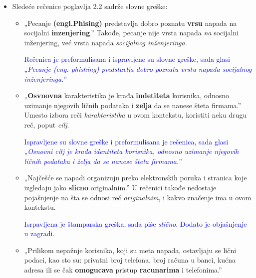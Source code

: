 \documentclass[a4paper]{report}
\newcommand{\odgovor}[1]{\textcolor{blue}{#1}}
\begin{document}
\begin{itemize}
    \item Sledeće rečenice poglavlja 2.2 sadrže slovne greške:
    \begin{itemize}
        \item „Pecanje \textbf{(engl.Phising)} predstavlja dobro poznatu \textbf{vrsu} napada na socijalni \textbf{inzenjering}.”\newline
Takođe, pecanje nije vrsta napada \textit{na} socijalni inženjering, već vrsta napada \textit{socijalnog inženjeringa}.

		\odgovor{Rečenica je preformulisana i ispravljene su slovne greške, sada glasi „\textit{Pecanje (eng. phishing) predstavlja dobro poznatu vrstu napada socijalnog inženjeringa.}”}
		
    \end{itemize}
    \begin{itemize}
    \item „\textbf{Osvnovna} karakteristika je krađa \textbf{indetiteta} korisnika, odnosno uzimanje njegovih ličnih podataka i \textbf{zelja} da se nanese šteta firmama.”
Umesto izbora reči \textit{karakteristika} u ovom kontekstu, koristiti neku drugu reč, poput \textit{cilj}. 
	
	\odgovor{Ispravljene su slovne greške i preformulisana je rečenica, sada glasi „\textit{Osnovni cilj je krađa identiteta korisnika, odnosno uzimanje njegovih ličnih podataka i želja da se nanese šteta firmama.}”}
	
    \end{itemize}
    \begin{itemize}
        \item  „Najčešće se napadi organizuju preko elektronskih poruka i stranica koje izgledaju jako \textbf{slicno} originalnim.”\newline
        U rečenici takođe nedostaje pojašnjenje na šta se odnosi reč  \textit{originalnim}, i kakvo značenje ima u ovom kontekstu.
        
        \odgovor{Isrpavljena je štamparska greška, sada piše \textit{slično}. Dodato je objašnjenje u zagradi. }
        
    \end{itemize}
    \begin{itemize}
        \item „Prilikom nepažnje korisnika, koji su meta
napada, ostavljaju se lični podaci, kao sto su: privatni broj telefona, broj računa u banci, kućna adresa ili se čak \textbf{omogucava} pristup \textbf{racunarima} i telefonima.”
		

\end{itemize}
\end{itemize}
\end{document}

